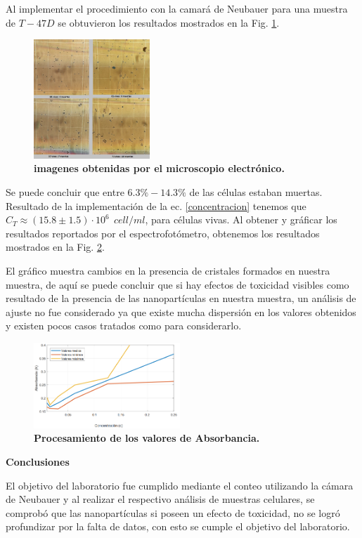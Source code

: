 Al implementar el procedimiento con la camará de Neubauer para una muestra de $T-47D$ se obtuvieron los resultados mostrados en la Fig. \ref{conteo}.
\begin{figure}
    \includegraphics[width=0.39\textwidth]{Tarea5/conteo.png}
    \caption{\textbf{imagenes obtenidas por el microscopio electrónico.}}
    \label{conteo}
\end{figure}
Se puede concluir que entre $6.3\% - 14.3\%$ de las células estaban muertas. Resultado de la implementación de la ec. \ref{concentracion} tenemos que $C_T\approx (15.8 \pm 1.5)\cdot 10^6 ~~cell/ml$, para células vivas. Al obtener y gráficar los resultados reportados por el espectrofotómetro, obtenemos los resultados mostrados en la Fig. \ref{toxicidad}.

El gráfico muestra cambios en la presencia de cristales formados en nuestra muestra, de aquí se puede concluir que si hay efectos de toxicidad visibles como resultado de la presencia de las nanopartículas en nuestra muestra, un análisis de ajuste no fue considerado ya que existe mucha dispersión en los valores obtenidos y existen pocos casos tratados como para considerarlo.
\begin{figure}
    \includegraphics[width=0.49\textwidth]{Tarea5/nano_con_cell.png}
    \caption{\textbf{Procesamiento de los valores de Absorbancia.}}
    \label{toxicidad}
\end{figure}



\textbf{\textcolor{azul50}{Conclusiones}}

El objetivo del laboratorio fue cumplido mediante el conteo utilizando la cámara de Neubauer y al realizar el respectivo análisis de muestras celulares, se comprobó que las nanopartículas si poseen un efecto de toxicidad, no se logró profundizar por la falta de datos, con esto se cumple el objetivo del laboratorio.
